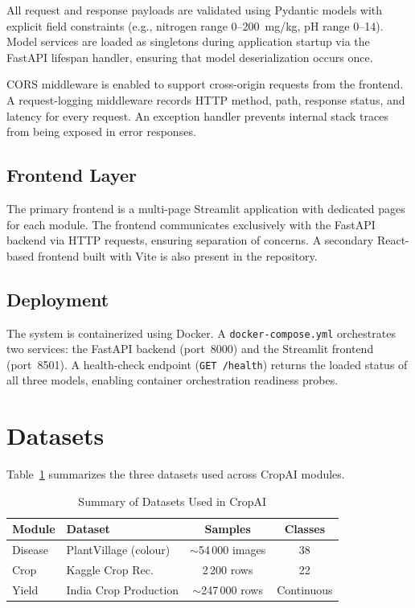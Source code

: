 \documentclass[conference]{IEEEtran}
\begin{document}
All request and response payloads are validated using Pydantic models with explicit field constraints (e.g., nitrogen range 0--200~mg/kg, pH range 0--14). Model services are loaded as singletons during application startup via the FastAPI lifespan handler, ensuring that model deserialization occurs once.

CORS middleware is enabled to support cross-origin requests from the frontend. A request-logging middleware records HTTP method, path, response status, and latency for every request. An exception handler prevents internal stack traces from being exposed in error responses.

\subsection{Frontend Layer}
The primary frontend is a multi-page Streamlit application with dedicated pages for each module. The frontend communicates exclusively with the FastAPI backend via HTTP requests, ensuring separation of concerns. A secondary React-based frontend built with Vite is also present in the repository.

\subsection{Deployment}
The system is containerized using Docker. A \texttt{docker-compose.yml} orchestrates two services: the FastAPI backend (port~8000) and the Streamlit frontend (port~8501). A health-check endpoint (\texttt{GET /health}) returns the loaded status of all three models, enabling container orchestration readiness probes.


\section{Datasets}
\label{sec:datasets}

Table~\ref{tab:datasets} summarizes the three datasets used across CropAI modules.

\begin{table}[htbp]
  \centering
  \caption{Summary of Datasets Used in CropAI}
  \label{tab:datasets}
  \begin{tabularx}{\columnwidth}{lXcc}
    \toprule
    \textbf{Module} & \textbf{Dataset} & \textbf{Samples} & \textbf{Classes} \\
    \midrule
    Disease & PlantVillage (colour) & ${\sim}$54\,000 images & 38 \\
    Crop    & Kaggle Crop Rec.      & 2\,200 rows         & 22 \\
    Yield   & India Crop Production & ${\sim}$247\,000 rows & Continuous \\
    \bottomrule
  \end{tabularx}
\end{table}
\end{document}
